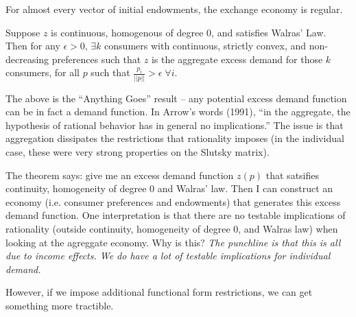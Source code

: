 \begin{theorem}[Debreu 1970]
  For almost every vector of initial endowments, the exchange economy
  is regular.
\end{theorem}

\begin{theorem}
  Suppose $z$ is continuous, homogenous of degree $0$, and satisfies
  Walras' Law. Then for any $\epsilon > 0$, $\exists k$ consumers with
  continuous, strictly convex, and non-decreasing preferences such
  that $z$ is the aggregate excess demand for those $k$ consumers, for
  all $p$ such that $\frac{p_i}{||p||} > \epsilon \; \forall i$.
\end{theorem}

The above is the ``Anything Goes'' result -- any potential excess
demand function can be in fact a demand function. In Arrow's words
(1991), ``in the aggregate, the hypothesis of rational behavior has in
general no implications.'' The issue is that aggregation dissipates
the restrictions that rationality imposes (in the individual case,
these were very strong properties on the Slutsky matrix). 

The theorem says: give me an excess demand function $z(p)$ that
satsifies continuity, homogeneity of degree 0 and Walras’ law. Then I
can construct an economy (i.e. consumer preferences and endowments)
that generates this excess demand function. One interpretation is that
there are no testable implications of rationality (outside continuity,
homogeneity of degree 0, and Walras law) when looking at the agreggate
economy.  Why is this? \textit{The punchline is that this is all due
  to income effects. We do have a lot of testable implications for
  individual demand.}

However, if we impose additional functional form restrictions, we can
get something more tractible.
